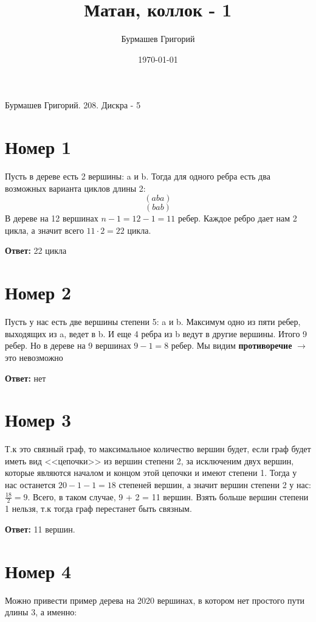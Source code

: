\documentclass[a4paper,12pt]{article}
\author{Бурмашев Григорий}
\title{Матан, коллок - 1 }
\date{\today}
\begin{document}
\begin{center}
Бурмашев Григорий. 208. Дискра - 5
\end{center}
\section*{Номер 1}
Пусть в дереве есть 2 вершины: a и b. Тогда для одного ребра есть два возможных варианта циклов длины 2:
\[
(aba)
\]
\[
(bab)
\]
В дереве на 12 вершинах $n - 1 = 12 - 1 = 11 $ ребер. Каждое ребро дает нам 2 цикла, а значит всего  $11 \cdot 2 = 22$ цикла.
\begin{center}
\textbf{Ответ:} 22 цикла
\end{center}

\section*{Номер 2}
Пусть у нас есть две вершины степени 5: a и b. Максимум одно из пяти ребер, выходящих из a, ведет в b. И еще 4 ребра из b ведут в другие вершины. Итого 9 ребер. Но в дереве на 9 вершинах $9 - 1 = 8 $ ребер. Мы видим \textbf{противоречие} $ \rightarrow$ это невозможно
\begin{center}
\textbf{Ответ:} нет
\end{center}

\section*{Номер 3}
Т.к это связный граф, то максимальное количество вершин будет, если граф будет иметь вид <<цепочки>> из вершин степени 2, за исключеним двух вершин, которые являются началом и концом этой цепочки и имеют степени 1. Тогда у нас останется $20 - 1 - 1 = 18 $ степеней вершин, а значит вершин степени 2 у нас: $\frac{18}{2} = 9$. Всего, в таком случае, 9 + 2 = 11 вершин. Взять больше вершин степени 1 нельзя, т.к тогда граф перестанет быть связным.
\begin{center}
\textbf{Ответ:} 11 вершин.
\end{center}

\section*{Номер 4}
Можно привести пример дерева на 2020 вершинах, в котором нет простого пути длины 3, а именно:
\end{document}
